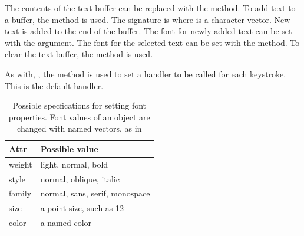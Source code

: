 The contents of the text buffer can be replaced with the
 method. To add text to a buffer, the
 method is used. The signature is
 where  is a character vector. New text
is added to the end of the buffer. The font for newly added text can
be set with the  argument. The font for the selected
text can be set with the  method. To clear the text
buffer, the  method is used.

As with, , the  method is used
to set a handler to be called for each keystroke. This is the default handler.


\begin{table}
\centering
\label{tab:gWidgets-font-properties}
\caption{Possible specfications for setting font properties. Font values of an object are changed with named vectors, as in }
\begin{tabular}{@{}lp{}@{}}
\toprule

Attr&Possible value\\
\midrule
weight&light, normal, bold\\style&normal, oblique, italic\\family&normal, sans, serif, monospace\\size&a point size, such as 12\\color&a named color
\\ \bottomrule
\end{tabular}
\end{table}
